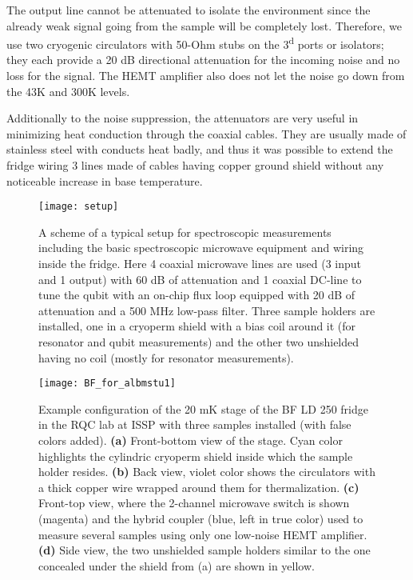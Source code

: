 The output line cannot be attenuated to isolate the environment since the already weak signal going from the sample will be completely lost. Therefore, we use two cryogenic circulators with 50-Ohm stubs on the 3\textsuperscript{d} ports or isolators; they each provide a 20 dB directional attenuation for the incoming noise and no loss for the signal. The HEMT amplifier also does not let the noise go down from the 43K and 300K levels.

Additionally to the noise suppression, the attenuators are very useful in minimizing heat conduction through the coaxial cables. They are usually made of stainless steel with conducts heat badly, and thus it was possible to extend the fridge wiring 3 lines made of cables having copper ground shield without any noticeable increase in base temperature.

\begin{figure}
\centering
\texttt{[image: setup]}
\caption{A scheme of a typical setup for spectroscopic measurements including the basic spectroscopic microwave equipment and wiring inside the fridge. Here 4 coaxial microwave lines are used (3 input and 1 output) with 60 dB of attenuation and 1 coaxial DC-line to tune the qubit with an on-chip flux loop equipped with 20 dB of attenuation and a 500 MHz low-pass filter. Three sample holders are installed, one in a cryoperm shield with a bias coil around it (for resonator and qubit measurements) and the other two unshielded having no coil (mostly for resonator measurements).}
\label{fig:cryo_wiring}
\end{figure}

\begin{figure}[t]
\centering
\texttt{[image: BF\_for\_albmstu1]}
\caption{Example configuration of the 20 mK stage of the BF LD 250 fridge in the RQC lab at ISSP with three samples installed (with false colors added). \textbf{(a)} Front-bottom view of the stage. Cyan color highlights the cylindric cryoperm shield inside which the sample holder resides. \textbf{(b)} Back view, violet color shows the circulators with a thick copper wire wrapped around them for thermalization. \textbf{(c)} Front-top view, where the 2-channel  microwave switch is shown (magenta) and the hybrid coupler (blue, left in true color) used to measure several samples using only one low-noise HEMT amplifier. \textbf{(d)} Side view, the two unshielded sample holders similar to the one concealed under the shield from (a) are shown in yellow.}
\label{fig:configuratio_photo}
\end{figure}

